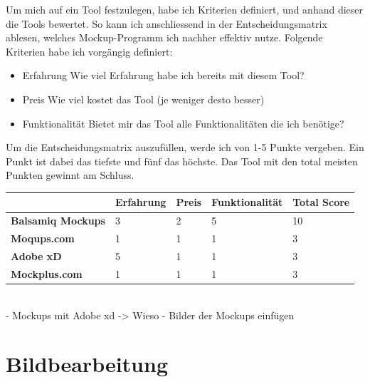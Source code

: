 \documentclass[11pt]{article}
\begin{document}
    Um mich auf ein Tool festzulegen, habe ich Kriterien definiert, und anhand dieser die Tools bewertet. So
    kann ich anschliessend in der Entscheidungsmatrix ablesen, welches Mockup-Programm ich nachher effektiv
    nutze. Folgende Kriterien habe ich vorgängig definiert:

    \begin{itemize}
        \item Erfahrung \textrightarrow Wie viel Erfahrung habe ich bereits mit diesem Tool?
        \item Preis \textrightarrow Wie viel kostet das Tool (je weniger desto besser)
        \item Funktionalität \textrightarrow Bietet mir das Tool alle Funktionalitäten die ich benötige?
    \end{itemize}

    Um die Entscheidungsmatrix auszufüllen, werde ich von 1-5 Punkte vergeben. Ein Punkt ist dabei das tiefste
    und fünf das höchste. Das Tool mit den total meisten Punkten gewinnt am Schluss.\\

    \begin{center}
        \begin{tabular}{ | p{4cm} | p{2.5cm} | p{2.5cm} | p{3cm} | p{2.5cm} | }
            \hline
            & \textbf{Erfahrung} & \textbf{Preis} & \textbf{Funktionalität} & \textbf{Total Score} \\ \hline
            \textbf{Balsamiq Mockups} & 3                  & 2              & 5                       & 10                   \\ \hline
            \textbf{Moqups.com}       & 1                  & 1              & 1                       & 3                    \\ \hline
            \textbf{Adobe xD}         & 5                  & 1              & 1                       & 3                    \\ \hline
            \textbf{Mockplus.com}     & 1                  & 1              & 1                       & 3                    \\ \hline
        \end{tabular}
    \end{center}
    \\
    - Mockups mit Adobe xd -> Wieso
    - Bilder der Mockups einfügen



    \section{Bildbearbeitung}
\end{document}
